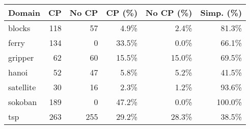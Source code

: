\begin{tabular}{l|rr|rr|r}
	\toprule
	Domain & CP & No CP & CP (\%) & No CP (\%) & Simp. (\%) \\ 
	\midrule 
	blocks & 118 & 57 & 4.9\% & 2.4\% & 81.3\% \\ 
	ferry & 134 & 0 & 33.5\% & 0.0\% & 66.1\% \\ 
	gripper & 62 & 60 & 15.5\% & 15.0\% & 69.5\% \\ 
	hanoi & 52 & 47 & 5.8\% & 5.2\% & 41.5\% \\ 
	satellite & 30 & 16 & 2.3\% & 1.2\% & 93.6\% \\ 
	sokoban & 189 & 0 & 47.2\% & 0.0\% & 100.0\% \\ 
	tsp & 263 & 255 & 29.2\% & 28.3\% & 38.5\% \\ 
	\bottomrule
\end{tabular}